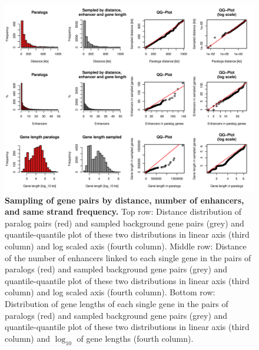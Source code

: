 \documentclass[a4paper,twoside=true,openright,parskip=full,chapterprefix=true,11pt,headings=normal,bibliography=totoc,listof=totoc,titlepage=on,captions=tableabove,draft=false]{scrreprt}
\theoremstyle{definition}
\theoremstyle{definition}
\theoremstyle{definition}
\theoremstyle{remark}
\begin{document}
\begin{figure}

{\centering \includegraphics[width=0.8\linewidth]{figures/paralog/SI/figS6} 

}

\caption{\textbf{Sampling of gene pairs by distance,
number of enhancers, and same strand frequency.} Top row: Distance
distribution of paralog pairs (red) and sampled background gene pairs
(grey) and quantile-quantile plot of these two distributions in linear
axis (third column) and log scaled axis (fourth column). Middle row:
Distance of the number of enhancers linked to each single gene in the
pairs of paralogs (red) and sampled background gene pairs (grey) and
quantile-quantile plot of these two distributions in linear axis (third
column) and log scaled axis (fourth column). Bottom row: Distribution of
gene lengths of each single gene in the pairs of paralogs (red) and
sampled background gene pairs (grey) and quantile-quantile plot of these
two distributions in linear axis (third column) and \(\log_{10}\) of
gene lengths (fourth column).}\label{fig:samplingDistEhLen}
\end{figure}
\end{document}
